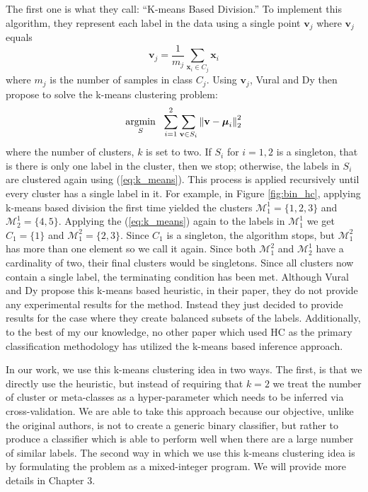 \documentclass[../thesis.tex]{subfiles}
\begin{document}
The first one is what they call: ``K-means Based Division.'' To implement this algorithm, they represent each label in the data using a single point $\mathbf{v}_j$ where $\mathbf{v}_j$ equals
\begin{equation}
    \label{eq:kmeans_mean}
    \mathbf{v}_j = \frac{1}{m_j} \sum_{\mathbf{x}_i \in C_j} \mathbf{x}_i
\end{equation}
where $m_j$ is the number of samples in class $C_j$. Using $\mathbf{v}_j$, Vural and Dy then propose to solve the k-means clustering problem:
\begin{equation}
    \label{eq:k_means}
    \underset{S}{\operatorname*{argmin}} \ \ \sum_{i=1}^2 \sum_{\mathbf{v} \in S_i} \left \Vert \mathbf{v} - \boldsymbol{\mu}_i \right \Vert_2^2
\end{equation}
where the number of clusters, $k$ is set to two. If $S_i$ for $i = 1, 2$ is a singleton, that is there is only one label in the cluster, then we stop; otherwise, the labels in $S_i$ are clustered again using (\ref{eq:k_means}). This process is applied recursively until every cluster has a single label in it. For example, in Figure \ref{fig:bin_hc}, applying k-means based division the first time yielded the clusters $\mathcal{M}_1^1 = \{1, 2, 3\}$ and $\mathcal{M}_2^1 = \{4, 5\}$. Applying the (\ref{eq:k_means}) again to the labels in $\mathcal{M}_1^1$ we get $C_1 = \{1\}$ and $\mathcal{M}_1^2 = \{2, 3\}$. Since $C_1$ is a singleton, the algorithm stops, but $\mathcal{M}_1^2$ has more than one element so we call it again. Since both $\mathcal{M}_1^2$ and $\mathcal{M}_2^1$ have a cardinality of two, their final clusters would be singletons. Since all clusters now contain a single label, the terminating condition has been met. Although Vural and Dy propose this k-means based heuristic, in their paper, they do not provide any experimental results for the method. Instead they just decided to provide results for the case where they create balanced subsets of the labels. Additionally, to the best of my our knowledge, no other paper which used HC as the primary classification methodology has utilized the k-means based inference approach. 

In our work, we use this k-means clustering idea in two ways. The first, is that we directly use the heuristic, but instead of requiring that $k=2$ we treat the number of cluster or meta-classes as a hyper-parameter which needs to be inferred via cross-validation. We are able to take this approach because our objective, unlike the original authors, is not to create a generic binary classifier, but rather to produce a classifier which is able to perform well when there are a large number of similar labels. The second way in which we use this k-means clustering idea is by formulating the problem as a mixed-integer program. We will provide more details in Chapter 3. 
\end{document}
